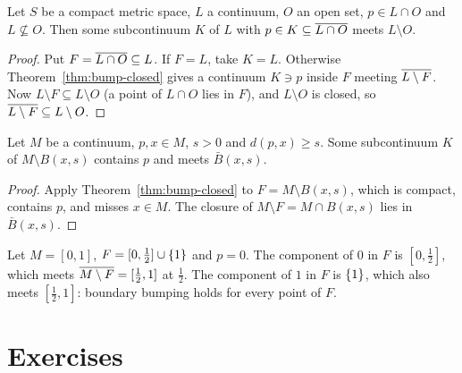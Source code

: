 
\begin{corollary}\label{cor:bump-open}
Let $S$ be a compact metric space, $L$ a continuum, $O$ an open set, $p\in L\cap O$ and
$L\not\subseteq O$. Then some subcontinuum $K$ of $L$ with $p\in K\subseteq\overline{L\cap O}$ meets
$L\setminus O$.
\end{corollary}

\begin{proof}
Put $F=\overline{L\cap O}\subseteq L$. If $F=L$, take $K=L$. Otherwise Theorem~\ref{thm:bump-closed} gives a
continuum $K\ni p$ inside $F$ meeting $\overline{L\setminus F}$. Now $L\setminus F\subseteq L\setminus O$
(a point of $L\cap O$ lies in $F$), and $L\setminus O$ is closed, so $\overline{L\setminus F}\subseteq
L\setminus O$.
\end{proof}


\begin{corollary}\label{cor:bump-ball}
Let $M$ be a continuum, $p,x\in M$, $s>0$ and $d(p,x)\ge s$. Some subcontinuum $K$ of
$M\setminus B(x,s)$ contains $p$ and meets $\bar B(x,s)$.
\end{corollary}

\begin{proof}
Apply Theorem~\ref{thm:bump-closed} to $F=M\setminus B(x,s)$, which is compact, contains $p$, and
misses $x\in M$. The closure of $M\setminus F=M\cap B(x,s)$ lies in $\bar B(x,s)$.
\end{proof}


\begin{example}
Let $M=[0,1]$, $F=[0,\tfrac12]\cup\left\{ 1 \right\}$ and $p=0$. The component of $0$ in $F$ is $[0,\frac12]$, which
meets $\overline{M\setminus F}=[\frac12,1]$ at $\frac12$. The component of $1$ in $F$ is $\left\{ 1 \right\}$, which
also meets $[\frac12,1]$: boundary bumping holds for every point of $F$.
\end{example}

\section*{Exercises}

